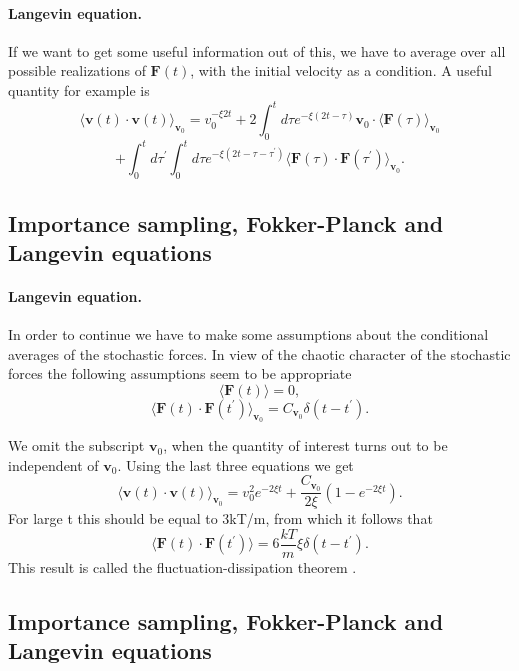 \documentclass[%
twoside,                 %
final,                   %
10pt]{article}
\begin{document}
{{{{{{%
\paragraph{Langevin equation.}
If we want to get some useful information out of this, we have to average over all possible realizations of 
$\mathbf{F}(t)$, with the initial velocity as a condition. A useful quantity for example is
\[ 
\langle \mathbf{v}(t)\cdot \mathbf{v}(t)\rangle_{\mathbf{v}_{0}}=v_{0}^{-\xi 2t}
+2\int_{0}^{t}d\tau e^{-\xi (2t-\tau)}\mathbf{v}_{0}\cdot \langle \mathbf{F}(\tau )\rangle_{\mathbf{v}_{0}}
\]
\[  	  	
 +\int_{0}^{t}d\tau ^{\prime }\int_{0}^{t}d\tau e^{-\xi (2t-\tau -\tau ^{\prime })}
\langle \mathbf{F}(\tau )\cdot \mathbf{F}(\tau ^{\prime })\rangle_{ \mathbf{v}_{0}}.
\]





\subsection{Importance sampling, Fokker-Planck and Langevin equations}

\paragraph{Langevin equation.}
In order to continue we have to make some assumptions about the conditional averages of the stochastic forces. 
In view of the chaotic character of the stochastic forces the following assumptions seem to be appropriate
\[ 
\langle \mathbf{F}(t)\rangle=0, 
\]
\[
\langle \mathbf{F}(t)\cdot \mathbf{F}(t^{\prime })\rangle_{\mathbf{v}_{0}}=  C_{\mathbf{v}_{0}}\delta (t-t^{\prime }).
\] 	

We omit the subscript $\mathbf{v}_{0}$, when the quantity of interest turns out to be independent of $\mathbf{v}_{0}$. Using the last three equations we get
 \[
\langle \mathbf{v}(t)\cdot \mathbf{v}(t)\rangle_{\mathbf{v}_{0}}=v_{0}^{2}e^{-2\xi t}+\frac{C_{\mathbf{v}_{0}}}{2\xi }(1-e^{-2\xi t}).
\]
For large t this should be equal to 3kT/m, from which it follows that
\[
\langle \mathbf{F}(t)\cdot \mathbf{F}(t^{\prime })\rangle =6\frac{kT}{m}\xi \delta (t-t^{\prime }). 
\]
This result is called the fluctuation-dissipation theorem .




\subsection{Importance sampling, Fokker-Planck and Langevin equations}

}}}}}}
\end{document}
